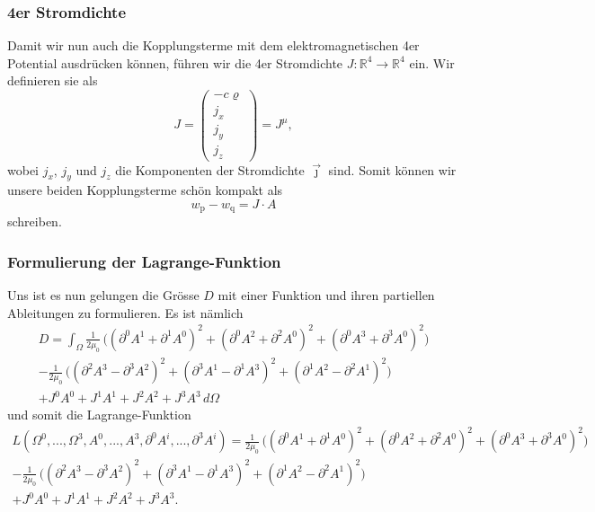 \subsubsection{4er Stromdichte}
Damit wir nun auch die Kopplungsterme mit dem elektromagnetischen 4er Potential ausdrücken können, führen wir die 4er Stromdichte
\(
J:\mathbb{R}^4 \rightarrow \mathbb{R}^4
\)
ein. Wir definieren sie als
\begin{equation}
J
=
\begin{pmatrix}
	-c\varrho\\
	j_x\\
	j_y\\
	j_z
\end{pmatrix}
=
J^{\mu},
\end{equation}
wobei $j_x$, $j_y$ und $j_z$ die Komponenten der Stromdichte $\vec{\jmath}$ sind.
Somit können wir unsere beiden Kopplungsterme schön kompakt  als
\begin{equation}
	w_{\text{p}} - w_{\text{q}}
	=
	J\cdot A
\end{equation}
schreiben.

\subsubsection{Formulierung der Lagrange-Funktion}
Uns ist es nun gelungen die Grösse $D$ mit einer Funktion und ihren partiellen Ableitungen zu formulieren.
Es ist nämlich 
\begin{align*}
D
=
\int_{\Omega}
\frac{1}{2\mu_0}\,\biggl(\left(\partial^0 A^1 + \partial^1 A^0\right)^2 + \left(\partial^0 A^2 + \partial^2 A^0\right)^2 + 
\left(\partial^0 A^3 + \partial^3 A^0\right)^2\biggr) \\
-  \frac{1}{2\mu_0}\,\biggl(\left(\partial^2 A^3 - \partial^3 A^2\right)^2 + \left(\partial^3 A^1 - \partial^1 A^3\right)^2 + 
\left(\partial^1 A^2 - \partial^2 A^1\right)^2\biggr)\\
+ J^0 A^0 + J^1 A^1 + J^2 A^2 + J^3 A^3 \,d\Omega
\end{align*}
und somit die Lagrange-Funktion
\begin{align*}
L(\Omega^0,...,\Omega^3, A^0,...,A^3, \partial^0 A^i,...,\partial^3 A^i)
=
\frac{1}{2\mu_0}\,\biggl(\left(\partial^0 A^1 + \partial^1 A^0\right)^2 + \left(\partial^0 A^2 + \partial^2 A^0\right)^2 + 
\left(\partial^0 A^3 + \partial^3 A^0\right)^2\biggr) \\
-  \frac{1}{2\mu_0}\,\biggl(\left(\partial^2 A^3 - \partial^3 A^2\right)^2 + \left(\partial^3 A^1 - \partial^1 A^3\right)^2 + 
\left(\partial^1 A^2 - \partial^2 A^1\right)^2\biggr)\\
+ J^0 A^0 + J^1 A^1 + J^2 A^2 + J^3 A^3.
\end{align*}

